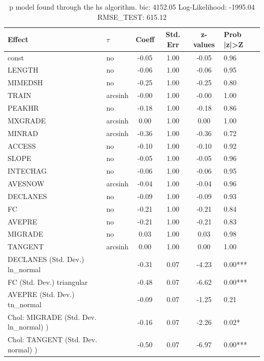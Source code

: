 \begin{table}
	\caption{p model found through the hs algorithm. bic: 4152.05 Log-Likelihood: -1995.04 RMSE_TEST: 615.12}
	\begin{center}
		\begin{tabular}{|l|l|c|c|c|l|}
			\hline
			Effect & $\tau$ & Coeff & Std. Err & z-values & Prob |z|>Z \\
			\hline
			const & no & -0.05 & 1.00 & -0.05 & 0.96 \\
			\hline
			LENGTH & no & -0.06 & 1.00 & -0.06 & 0.95 \\
			\hline
			MIMEDSH & no & -0.25 & 1.00 & -0.25 & 0.80 \\
			\hline
			TRAIN & arcsinh & -0.00 & 1.00 & -0.00 & 1.00 \\
			\hline
			PEAKHR & no & -0.18 & 1.00 & -0.18 & 0.86 \\
			\hline
			MXGRADE & arcsinh & 0.00 & 1.00 & 0.00 & 1.00 \\
			\hline
			MINRAD & arcsinh & -0.36 & 1.00 & -0.36 & 0.72 \\
			\hline
			ACCESS & no & -0.10 & 1.00 & -0.10 & 0.92 \\
			\hline
			SLOPE & no & -0.05 & 1.00 & -0.05 & 0.96 \\
			\hline
			INTECHAG & no & -0.06 & 1.00 & -0.06 & 0.95 \\
			\hline
			AVESNOW & arcsinh & -0.04 & 1.00 & -0.04 & 0.96 \\
			\hline
			DECLANES & no & -0.09 & 1.00 & -0.09 & 0.93 \\
			\hline
			FC & no & -0.21 & 1.00 & -0.21 & 0.84 \\
			\hline
			AVEPRE & no & -0.21 & 1.00 & -0.21 & 0.83 \\
			\hline
			MIGRADE & no & 0.03 & 1.00 & 0.03 & 0.98 \\
			\hline
			TANGENT & arcsinh & 0.00 & 1.00 & 0.00 & 1.00 \\
			\hline
			DECLANES (Std. Dev.) ln_normal &  & -0.31 & 0.07 & -4.23 & 0.00*** \\
			\hline
			FC (Std. Dev.) triangular &  & -0.48 & 0.07 & -6.62 & 0.00*** \\
			\hline
			AVEPRE (Std. Dev.) tn_normal &  & -0.09 & 0.07 & -1.25 & 0.21 \\
			\hline
			 Chol: MIGRADE (Std. Dev. ln_normal) ) &  & -0.16 & 0.07 & -2.26 & 0.02* \\
			\hline
			 Chol: TANGENT (Std. Dev. normal) ) &  & -0.50 & 0.07 & -6.97 & 0.00*** \\

\end{tabular}
\end{center}
\end{table}
